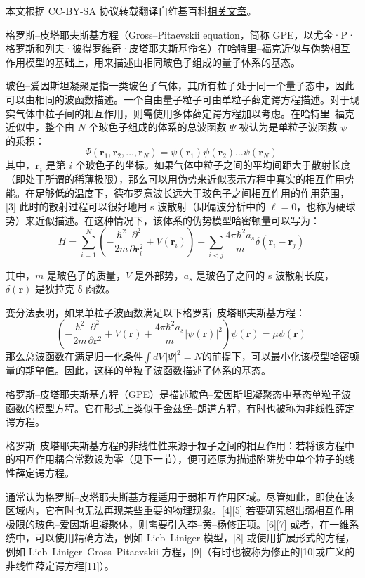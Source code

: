 
本文根据 CC-BY-SA 协议转载翻译自维基百科\href{https://en.wikipedia.org/wiki/Gross\%E2\%80\%93Pitaevskii_equation}{相关文章}。

格罗斯–皮塔耶夫斯基方程（Gross–Pitaevskii equation，简称 GPE，以尤金·P·格罗斯和列夫·彼得罗维奇·皮塔耶夫斯基命名）在哈特里–福克近似与伪势相互作用模型的基础上，用来描述由相同玻色子组成的量子体系的基态。

玻色–爱因斯坦凝聚是指一类玻色子气体，其所有粒子处于同一个量子态中，因此可以由相同的波函数描述。一个自由量子粒子可由单粒子薛定谔方程描述。对于现实气体中粒子间的相互作用，则需使用多体薛定谔方程加以考虑。在哈特里–福克近似中，整个由 $N$ 个玻色子组成的体系的总波函数 $\Psi$ 被认为是单粒子波函数 $\psi$ 的乘积：
$$
\Psi(\mathbf{r}_1, \mathbf{r}_2, \dots, \mathbf{r}_N) = \psi(\mathbf{r}_1)\psi(\mathbf{r}_2) \dots \psi(\mathbf{r}_N)~
$$
其中，$\mathbf{r}_i$ 是第 $i$ 个玻色子的坐标。如果气体中粒子之间的平均间距大于散射长度（即处于所谓的稀薄极限），那么可以用伪势来近似表示方程中真实的相互作用势能。在足够低的温度下，德布罗意波长远大于玻色子之间相互作用的作用范围，[3] 此时的散射过程可以很好地用 s 波散射（即偏波分析中的 $\ell = 0$，也称为硬球势）来近似描述。在这种情况下，该体系的伪势模型哈密顿量可以写为：
$$
H = \sum_{i=1}^{N} \left( -\frac{\hbar^2}{2m} \frac{\partial^2}{\partial \mathbf{r}_i^2} + V(\mathbf{r}_i) \right) + \sum_{i<j} \frac{4\pi \hbar^2 a_s}{m} \delta(\mathbf{r}_i - \mathbf{r}_j)~
$$

其中，$m$ 是玻色子的质量，$V$ 是外部势，$a_s$ 是玻色子之间的 s 波散射长度，$\delta(\mathbf{r})$ 是狄拉克 δ 函数。

变分法表明，如果单粒子波函数满足以下格罗斯–皮塔耶夫斯基方程：
$$
\left(-\frac{\hbar^2}{2m} \frac{\partial^2}{\partial \mathbf{r}^2} + V(\mathbf{r}) + \frac{4\pi \hbar^2 a_s}{m} |\psi(\mathbf{r})|^2 \right) \psi(\mathbf{r}) = \mu \psi(\mathbf{r})~
$$
那么总波函数在满足归一化条件$\int dV\,|\Psi|^2 = N$的前提下，可以最小化该模型哈密顿量的期望值。因此，这样的单粒子波函数描述了体系的基态。

格罗斯–皮塔耶夫斯基方程（GPE）是描述玻色–爱因斯坦凝聚态中基态单粒子波函数的模型方程。它在形式上类似于金兹堡–朗道方程，有时也被称为非线性薛定谔方程。

格罗斯–皮塔耶夫斯基方程的非线性性来源于粒子之间的相互作用：若将该方程中的相互作用耦合常数设为零（见下一节），便可还原为描述陷阱势中单个粒子的线性薛定谔方程。

通常认为格罗斯–皮塔耶夫斯基方程适用于弱相互作用区域。尽管如此，即使在该区域内，它有时也无法再现某些重要的物理现象。[4][5] 若要研究超出弱相互作用极限的玻色–爱因斯坦凝聚体，则需要引入李–黄–杨修正项。[6][7] 或者，在一维系统中，可以使用精确方法，例如 Lieb–Liniger 模型，[8] 或使用扩展形式的方程，例如 Lieb–Liniger–Gross–Pitaevskii 方程，[9]（有时也被称为修正的[10]或广义的非线性薛定谔方程[11]）。
